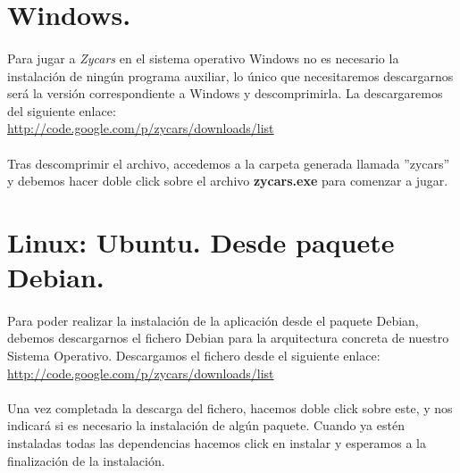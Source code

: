 \section{Windows.}

\paragraph{}
Para jugar a \emph{Zycars} en el sistema operativo Windows no es necesario la instalación de ningún programa
auxiliar, lo único que necesitaremos descargarnos será la versión correspondiente
a Windows y descomprimirla. La descargaremos
del siguiente enlace:\\

\url{http://code.google.com/p/zycars/downloads/list}

\paragraph{}
Tras descomprimir el archivo, accedemos a la carpeta generada llamada ''zycars'' y debemos hacer doble click 
sobre el archivo \textbf{zycars.exe} para comenzar a jugar.


\section{Linux: Ubuntu. Desde paquete Debian.}

\paragraph{}
Para poder realizar la instalación de la aplicación desde el paquete Debian, debemos descargarnos el fichero Debian para
la arquitectura concreta de nuestro Sistema Operativo. Descargamos el fichero desde el siguiente enlace:\\

\url{http://code.google.com/p/zycars/downloads/list}

\paragraph{}
Una vez completada la descarga del fichero, hacemos doble click sobre este, y nos indicará si es necesario la instalación 
de algún paquete. Cuando ya estén instaladas todas las dependencias hacemos click en instalar y esperamos a la finalización
de la instalación.


